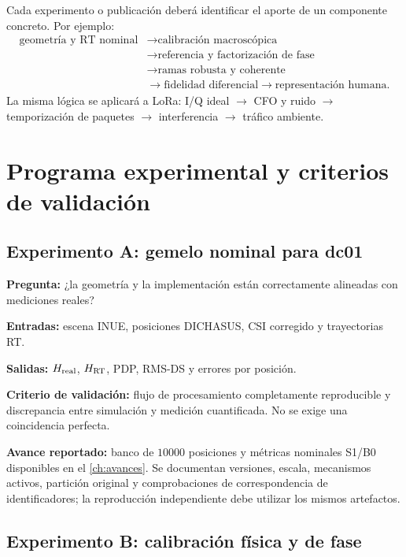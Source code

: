 Cada experimento o publicación deberá identificar el aporte de un componente concreto. Por ejemplo:
\begin{equation}
\begin{aligned}
\text{geometría y RT nominal}
&\rightarrow \text{calibración macroscópica}\\
&\rightarrow \text{referencia y factorización de fase}\\
&\rightarrow \text{ramas robusta y coherente}\\
&\rightarrow \text{fidelidad diferencial}
\rightarrow \text{representación humana}.
\end{aligned}
\end{equation}
La misma lógica se aplicará a LoRa: I/Q ideal $\rightarrow$ CFO y ruido $\rightarrow$ temporización de paquetes $\rightarrow$ interferencia $\rightarrow$ tráfico ambiente.

\section{Programa experimental y criterios de validación}

\subsection{Experimento A: gemelo nominal para dc01}

\textbf{Pregunta:} ¿la geometría y la implementación están correctamente alineadas con mediciones reales?

\textbf{Entradas:} escena INUE, posiciones DICHASUS, CSI corregido y trayectorias RT.

\textbf{Salidas:} $H_{\rm real}$, $H_{\rm RT}$, PDP, RMS-DS y errores por posición.

\textbf{Criterio de validación:} flujo de procesamiento completamente reproducible y discrepancia entre simulación y medición cuantificada. No se exige una coincidencia perfecta.

\textbf{Avance reportado:} banco de $10000$ posiciones y métricas nominales S1/B0 disponibles en el \cref{ch:avances}. Se documentan versiones, escala, mecanismos activos, partición original y comprobaciones de correspondencia de identificadores; la reproducción independiente debe utilizar los mismos artefactos.

\subsection{Experimento B: calibración física y de fase}

